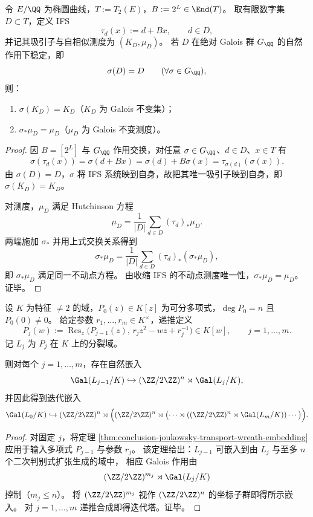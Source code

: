 \begin{proposition}\label{prop:conclusion-galois-stable-digit-set-attractor-measure-invariance}
令 \(E/\QQ\) 为椭圆曲线，\(T:=T_2(E)\)，\(B:=2^L\in\End(T)\)。
取有限数字集 \(D\subset T\)，定义 IFS
\[
\tau_d(x):=d+Bx,\qquad d\in D,
\]
并记其吸引子与自相似测度为 \((K_D,\mu_D)\)。
若 \(D\) 在绝对 Galois 群 \(G_\QQ\) 的自然作用下稳定，即
\[
\sigma(D)=D\qquad(\forall \sigma\in G_\QQ),
\]
则：
\begin{enumerate}
  \item \(\sigma(K_D)=K_D\)（\(K_D\) 为 Galois 不变集）；
  \item \(\sigma_*\mu_D=\mu_D\)（\(\mu_D\) 为 Galois 不变测度）。
\end{enumerate}
\end{proposition}
\begin{proof}
因 \(B=[2^L]\) 与 \(G_\QQ\) 作用交换，对任意 \(\sigma\in G_\QQ\)、\(d\in D\)、\(x\in T\) 有
\[
\sigma(\tau_d(x))=\sigma(d+Bx)=\sigma(d)+B\sigma(x)=\tau_{\sigma(d)}(\sigma(x)).
\]
由 \(\sigma(D)=D\)，\(\sigma\) 将 IFS 系统映到自身，故把其唯一吸引子映到自身，即 \(\sigma(K_D)=K_D\)。

对测度，\(\mu_D\) 满足 Hutchinson 方程
\[
\mu_D=\frac1{|D|}\sum_{d\in D}(\tau_d)_*\mu_D.
\]
两端施加 \(\sigma_*\) 并用上式交换关系得到
\[
\sigma_*\mu_D=\frac1{|D|}\sum_{d\in D}(\tau_d)_*(\sigma_*\mu_D),
\]
即 \(\sigma_*\mu_D\) 满足同一不动点方程。
由收缩 IFS 的不动点测度唯一性，\(\sigma_*\mu_D=\mu_D\)。证毕。
\end{proof}

\begin{theorem}\label{thm:conclusion-recursive-jg-transport-iterated-wreath-embedding}
设 \(K\) 为特征 \(\neq 2\) 的域，\(P_0(z)\in K[z]\) 为可分多项式，\(\deg P_0=n\) 且 \(P_0(0)\neq 0\)。
给定参数 \(r_1,\dots,r_m\in K^\times\)，递推定义
\[
P_j(w):=\operatorname{Res}_{z}\!\bigl(P_{j-1}(z),\,r_j z^2-wz+r_j^{-1}\bigr)\in K[w],
\qquad j=1,\dots,m.
\]
记 \(L_j\) 为 \(P_j\) 在 \(K\) 上的分裂域。

则对每个 \(j=1,\dots,m\)，存在自然嵌入
\[
\Gal(L_{j-1}/K)\hookrightarrow (\ZZ/2\ZZ)^n\rtimes \Gal(L_j/K),
\]
并因此得到迭代嵌入
\[
\Gal(L_0/K)\hookrightarrow
(\ZZ/2\ZZ)^n\rtimes\Bigl((\ZZ/2\ZZ)^n\rtimes\bigl(\cdots\rtimes((\ZZ/2\ZZ)^n\rtimes\Gal(L_m/K))\cdots\bigr)\Bigr).
\]
\end{theorem}
\begin{proof}
对固定 \(j\)，将定理 \ref{thm:conclusion-joukowsky-transport-wreath-embedding} 应用于输入多项式 \(P_{j-1}\) 与参数 \(r_j\)。
该定理给出：\(L_{j-1}\) 可嵌入到由 \(L_j\) 与至多 \(n\) 个二次判别式扩张生成的域中，
相应 Galois 作用由
\[
(\ZZ/2\ZZ)^{m_j}\rtimes \Gal(L_j/K)
\]
控制（\(m_j\le n\)）。
将 \((\ZZ/2\ZZ)^{m_j}\) 视作 \((\ZZ/2\ZZ)^n\) 的坐标子群即得所示嵌入。
对 \(j=1,\dots,m\) 递推合成即得迭代塔。证毕。
\end{proof}


